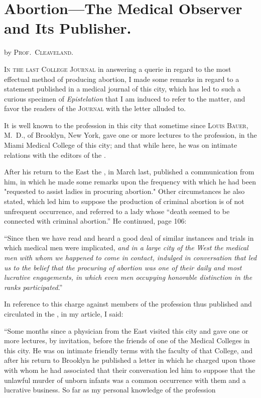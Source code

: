 \section*{Abortion---The  Medical  Observer and
Its Publisher.}

by \textsc{Prof.~Cleaveland.}

\lettrine[lines=1]{}{In the last College Journal} in answering a querie in regard to the
most effectual method of producing abortion, I made some remarks in
regard to a statement published in a medical journal of this city, which
has led to such a curious specimen of \emph{Epistelation} that I am induced
to refer to the matter, and favor the readers of the \textsc{Journal} with the
letter alluded to.

It is well known to the profession in this city that sometime since
\textsc{Louis Bauer}, M.~D., of Brooklyn, New York, gave one or more lectures
to the profession, in the Miami Medical College of this city; and that
while here, he was on intimate relations with the editors of the .

After his return to the East the , in March last, published a
communication from him, in which he made some remarks upon the
frequency with which he had been "requested to assist ladies in procuring
abortion." Other circumstances he also stated, which led him to
suppose the production of criminal abortion is of not unfrequent occurrence,
and referred to a lady whose ``death seemed to be connected with
criminal abortion.''   He continued, page 106:

``Since then we have read and heard a good deal of similar instances
and trials in which medical men were implicated, \emph{and in a large city
of the West the medical men with whom we happened to come in
contact, indulged in conversation that led us to the belief that the
procuring of abortion was one of their daily and most lucrative
engagements, in which even men occupying honorable distinction in
the ranks participated}.''

In reference to this charge against members of the profession thus
published and circulated in the , in my article, I
said:

``Some months since a physician from the East visited this city and
gave one or more lectures, by invitation, before the friends of one of
the Medical Colleges in this city. He was on intimate friendly terms
with the faculty of that College, and after his return to Brooklyn he
published a letter in which he charged upon those with whom he had
associated that their conversation led him to suppose that the unlawful
murder of unborn infants was a common occurrence with them and a
lucrative business.   So far as my personal knowledge of the profession\endinput

